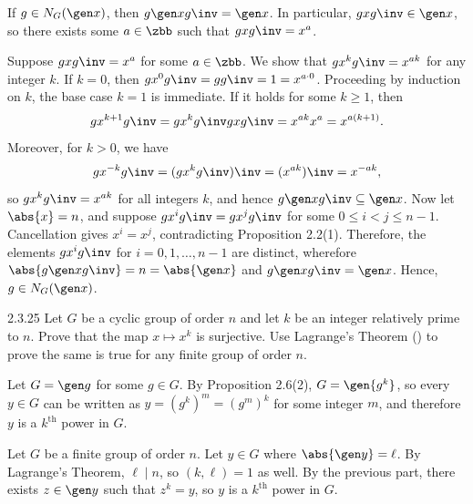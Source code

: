 \begin{solenum}
    \item If $g \in N_G(\gen x)$, then $g \gen x g\inv = \gen x$.
	In particular, $gxg\inv \in \gen x$, so there exists some $a \in \zbb$ such that $gxg\inv = x^a$.
    \item Suppose $gxg\inv = x^a$ for some $a \in \zbb$.
	We show that $gx^kg\inv = x^{ak}$ for any integer $k$.
    If $k = 0$, then $gx^0g\inv = gg\inv = 1 = x^{a \cdot 0}$.
    Proceeding by induction on $k$, the base case $k = 1$ is immediate.
    If it holds for some $k \geq 1$, then
    \[
        gx^{k + 1}g\inv = gx^kg\inv gxg\inv = x^{ak} x^a = x^{a(k + 1)}.
    \]
    Moreover, for $k > 0$, we have
    \[
        gx^{-k}g\inv = (gx^kg\inv)\inv = (x^{ak})\inv = x^{-ak},
    \]
    so $gx^kg\inv = x^{ak}$ for all integers $k$, and hence $g\gen xg\inv \subseteq \gen x$.
    Now let $\abs{x} = n$, and suppose $gx^ig\inv = gx^jg\inv$ for some $0 \leq i < j \leq n - 1$.
    Cancellation gives $x^i = x^j$, contradicting Proposition 2.2(1).
    Therefore, the elements $gx^ig\inv$ for $i = 0, 1, \ldots, n - 1$ are distinct, wherefore $\abs{g \gen xg\inv} = n = \abs{\gen x}$ and $g \gen xg\inv = \gen x$.
    Hence, $g \in N_G(\gen x)$.
\end{solenum}

\begin{exercise}{2.3.25}
    Let $G$ be a cyclic group of order $n$ and let $k$ be an integer relatively prime to $n$.
	Prove that the map $x \mapsto x^k$ is surjective.
	Use Lagrange's Theorem () to prove the same is true for any finite group of order $n$. 
\end{exercise}

\begin{sol}
    Let $G = \gen g$ for some $g \in G$.
    By Proposition 2.6(2), $G = \gen{g^k}$, so every $y \in G$ can be written as $y = (g^k)^m = (g^m)^k$ for some integer $m$, and therefore $y$ is a $k^{\text{th}}$ power in $G$.

    Let $G$ be a finite group of order $n$.
    Let $y \in G$ where $\abs{\gen y} = \ell$.
    By Lagrange's Theorem, $\ell \mid n$, so $(k, \ell) = 1$ as well.
    By the previous part, there exists $z \in \gen y$ such that $z^k = y$, so $y$ is a $k^{\text{th}}$ power in $G$.
\end{sol}

